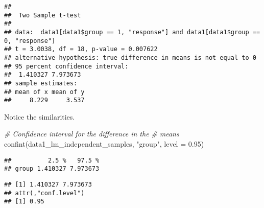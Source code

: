 \documentclass[
]{book}
\newenvironment{Shaded}{\begin{snugshade}}{\end{snugshade}}
\newcommand{\AttributeTok}[1]{\textcolor[rgb]{0.77,0.63,0.00}{#1}}
\newcommand{\CommentTok}[1]{\textcolor[rgb]{0.56,0.35,0.01}{\textit{#1}}}
\newcommand{\ConstantTok}[1]{\textcolor[rgb]{0.00,0.00,0.00}{#1}}
\newcommand{\DecValTok}[1]{\textcolor[rgb]{0.00,0.00,0.81}{#1}}
\newcommand{\FloatTok}[1]{\textcolor[rgb]{0.00,0.00,0.81}{#1}}
\newcommand{\FunctionTok}[1]{\textcolor[rgb]{0.00,0.00,0.00}{#1}}
\newcommand{\NormalTok}[1]{#1}
\newcommand{\SpecialCharTok}[1]{\textcolor[rgb]{0.00,0.00,0.00}{#1}}
\newcommand{\StringTok}[1]{\textcolor[rgb]{0.31,0.60,0.02}{#1}}
\begin{document}
\begin{Shaded}
\end{Shaded}

\begin{verbatim}
## 
##  Two Sample t-test
## 
## data:  data1[data1$group == 1, "response"] and data1[data1$group == 0, "response"]
## t = 3.0038, df = 18, p-value = 0.007622
## alternative hypothesis: true difference in means is not equal to 0
## 95 percent confidence interval:
##  1.410327 7.973673
## sample estimates:
## mean of x mean of y 
##     8.229     3.537
\end{verbatim}

Notice the similarities.

\begin{Shaded}
\begin{Highlighting}[]
\CommentTok{\# Confidence interval for the difference in the}
\CommentTok{\# means}
\FunctionTok{confint}\NormalTok{(data1\_lm\_independent\_samples, }\StringTok{"group"}\NormalTok{, }\AttributeTok{level =} \FloatTok{0.95}\NormalTok{)}
\end{Highlighting}
\end{Shaded}

\begin{verbatim}
##          2.5 %   97.5 %
## group 1.410327 7.973673
\end{verbatim}

\begin{Shaded}
\end{Shaded}

\begin{verbatim}
## [1] 1.410327 7.973673
## attr(,"conf.level")
## [1] 0.95
\end{verbatim}
\end{document}
